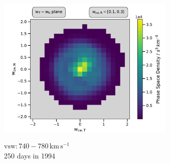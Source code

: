 \documentclass{beamer}
\begin{document}
\begin{frame}[plain]
\begin{columns}
\begin{figure}
	\end{figure}
	\column{6.5cm}
	\begin{figure}
		\includegraphics[scale=.4]{Pics/cart_lang_R_psd.pdf}


 {\scriptsize 		 $\mathrm{vsw} : 740 - 780 \, \mathrm{km\,s^{-1}}$ \\
		 250 days in 1994}

	\end{figure}
\end{columns}
\end{frame}
\end{document}
